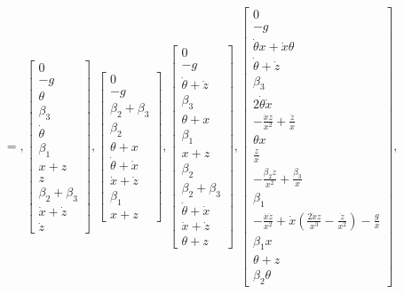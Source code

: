 \documentclass[12pt]{article}
\begin{document}
\begin{align*}
    &= ,\left[\begin{matrix}0\\- g\\\theta\\\beta_{3}\\\dot{\theta}\\\beta_{1}\\x + z\\z\\\beta_{2} + \beta_{3}\\\dot{x} + \dot{z}\\\dot{z}\end{matrix}\right],
    \left[\begin{matrix}0\\- g\\\beta_{2} + \beta_{3}\\\beta_{2}\\\theta + x\\\dot{\theta} + \dot{x}\\\dot{x} + \dot{z}\\\beta_{1}\\x + z\end{matrix}\right],
    \left[\begin{matrix}0\\- g\\\dot{\theta} + \dot{z}\\\beta_{3}\\\theta + x\\\beta_{1}\\x + z\\\beta_{2}\\\beta_{2} + \beta_{3}\\\dot{\theta} + \dot{x}\\\dot{x} + \dot{z}\\\theta + z\end{matrix}\right],
    \left[\begin{matrix}0\\- g\\\dot{\theta} x + \dot{x} \theta\\\dot{\theta} + \dot{z}\\\beta_{3}\\2 \dot{\theta} \dot{x}\\- \frac{\dot{x} z}{x^{2}} + \frac{\dot{z}}{x}\\\theta x\\\frac{z}{x}\\- \frac{\beta_{2} z}{x^{2}} + \frac{\beta_{3}}{x}\\\beta_{1}\\- \frac{\dot{x} \dot{z}}{x^{2}} + \dot{x} \left(\frac{2 \dot{x} z}{x^{3}} - \frac{\dot{z}}{x^{2}}\right) - \frac{g}{x}\\\beta_{1} x\\\theta + z\\\beta_{2} \theta\end{matrix}\right],

\end{align*}
\end{document}
